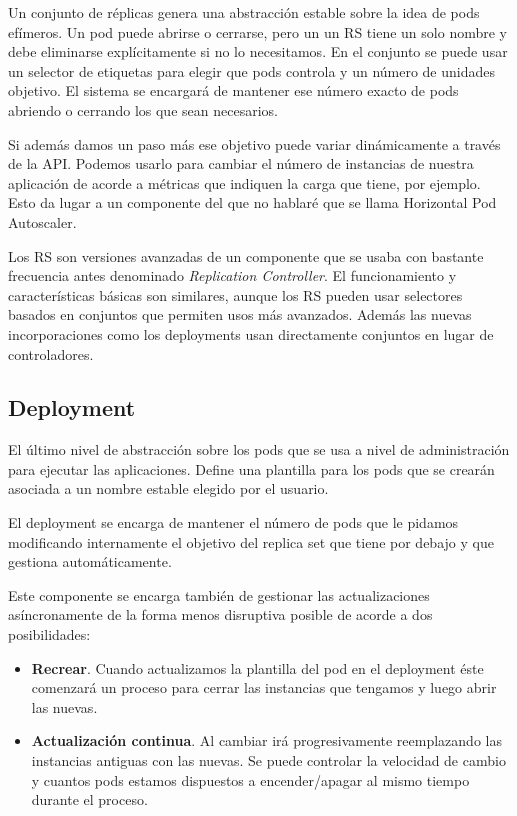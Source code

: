 Un conjunto de réplicas genera una abstracción estable sobre la idea de pods efímeros. Un pod puede abrirse o cerrarse, pero un un RS tiene un solo nombre y debe eliminarse explícitamente si no lo necesitamos. En el conjunto se puede usar un selector de etiquetas para elegir que pods controla y un número de unidades objetivo. El sistema se encargará de mantener ese número exacto de pods abriendo o cerrando los que sean necesarios.

Si además damos un paso más ese objetivo puede variar dinámicamente a través de la API. Podemos usarlo para cambiar el número de instancias de nuestra aplicación de acorde a métricas que indiquen la carga que tiene, por ejemplo. Esto da lugar a un componente del que no hablaré que se llama Horizontal Pod Autoscaler.

Los RS son versiones avanzadas de un componente que se usaba con bastante frecuencia antes denominado \emph{Replication Controller}. El funcionamiento y características básicas son similares, aunque los RS pueden usar selectores basados en conjuntos \cite{k8slabelsset} que permiten usos más avanzados. Además las nuevas incorporaciones como los deployments usan directamente conjuntos en lugar de controladores.

\subsection{Deployment}
\label{subsec:deployment}

El último nivel de abstracción sobre los pods que se usa a nivel de administración para ejecutar las aplicaciones. Define una plantilla para los pods que se crearán asociada a un nombre estable elegido por el usuario.

El deployment se encarga de mantener el número de pods que le pidamos modificando internamente el objetivo del replica set que tiene por debajo y que gestiona automáticamente.

Este componente se encarga también de gestionar las actualizaciones asíncronamente de la forma menos disruptiva posible de acorde a dos posibilidades:
\begin{itemize}
  \item \textbf{Recrear}. Cuando actualizamos la plantilla del pod en el deployment éste comenzará un proceso para cerrar las instancias que tengamos y luego abrir las nuevas.
  \item \textbf{Actualización continua}. Al cambiar irá progresivamente reemplazando las instancias antiguas con las nuevas. Se puede controlar la velocidad de cambio y cuantos pods estamos dispuestos a encender/apagar al mismo tiempo durante el proceso.
\end{itemize}

